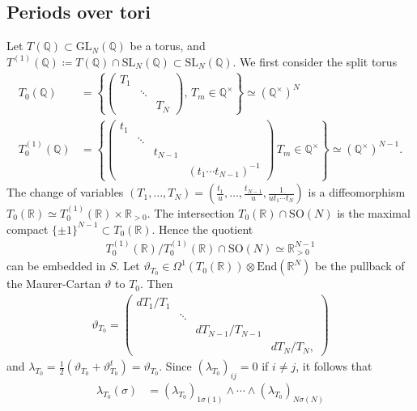 \documentclass[a4paper,11pt]{amsart} %
\newcommand{\8}{\infty}
\newcommand{\SO}{\mathrm{SO}}
\newcommand{\SL}{\mathrm{SL}}
\newcommand{\GL}{\mathrm{GL}}
\newcommand{\R}{\mathbb{R}}
\newcommand{\Q}{\mathbb{Q}}
\newcommand{\End}{\mathrm{End}}
\theoremstyle{mytheoremstyle}
\theoremstyle{remark}
\numberwithin{equation}{section}
\begin{document}
\subsection{Periods over tori} \label{sec:periodtori} Let $T(\Q) \subset \GL_N(\Q)$ be a torus, and $T^{(1)}(\Q)  \coloneqq T(\Q) \cap \SL_N(\Q) \subset \SL_N(\Q)$. We first consider the split torus
\begin{align}
T_0(\Q) &= \left \{ \begin{pmatrix}
T_1 & & \\
 & \ddots & \\
& & T_N
\end{pmatrix}, \, T_m  \in \Q^\times \right \} \simeq (\Q^\times)^{N} \\
T^{(1)}_0(\Q) & = \left \{ \begin{pmatrix}
t_1 & & & \\
 & \ddots & & \\
& & t_{N-1}& \\
& & & (t_1\cdots t_{N-1})^{-1}
\end{pmatrix} \, T_m  \in \Q^\times \right \} \simeq (\Q^\times)^{N-1}.
\end{align}
The change of variables $(T_1, \dots, T_N)=(\frac{t_1}{u}, \dots, \frac{t_{N-1}}{u},\frac{1}{ut_1\cdots t_N})$ is a diffeomorphism $T_0(\R) \simeq T_0^{(1)}(\R) \times \R_{>0}$.
The intersection $T_0(\R) \cap \SO(N)$ is the maximal compact $\{ \pm 1\}^{N-1} \subset T_0(\R)$. Hence the quotient 
\begin{align}
T^{(1)}_0(\R)/T^{(1)}_0(\R) \cap \SO(N) \simeq \R_{>0}^{N-1}
\end{align}
can be embedded in $S$. Let $\vartheta_{T_0} \in \Omega^1(T_0(\R)) \otimes \End(\R^N)$ be the pullback of the Maurer-Cartan $\vartheta$ to $T_0$. Then
\begin{align}
\vartheta_{T_0} = \begin{pmatrix}
dT_1/T_1 & & & \\
 & \ddots & & \\
& & dT_{N-1}/T_{N-1}& \\
& & & dT_N/T_N,
\end{pmatrix}
\end{align}
and $\lambda_{T_0}=\frac{1}{2}(\vartheta_{T_0} +\vartheta_{T_0} ^t)=\vartheta_{T_0} $. Since $(\lambda_{T_0})_{ij}=0$ if $i \neq j$, it follows that
\begin{align} \label{equation460}
\lambda_{T_0}(\sigma)  & = (\lambda_{T_0})_{1\sigma(1)} \wedge \cdots \wedge (\lambda_{T_0})_{N\sigma(N)}
\end{align}
\end{document}
